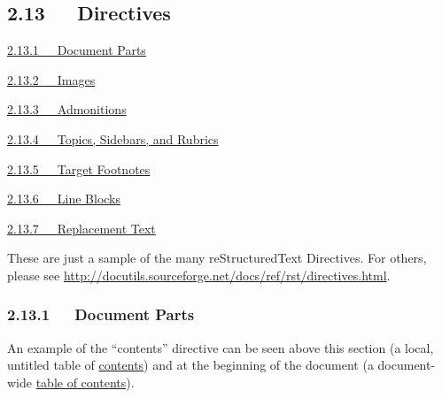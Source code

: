 \documentclass[10pt,a4paper,english]{article}
\begin{document}

\hypertarget{directives}{}
\subsection*{2.13~~~Directives}
\begin{list}{}{}
\item {} \href{\#document-parts}{2.13.1~~~Document Parts}

\item {} \href{\#images}{2.13.2~~~Images}

\item {} \href{\#admonitions}{2.13.3~~~Admonitions}

\item {} \href{\#topics-sidebars-and-rubrics}{2.13.4~~~Topics, Sidebars, and Rubrics}

\item {} \href{\#target-footnotes}{2.13.5~~~Target Footnotes}

\item {} \href{\#line-blocks}{2.13.6~~~Line Blocks}

\item {} \href{\#replacement-text}{2.13.7~~~Replacement Text}

\end{list}


These are just a sample of the many reStructuredText Directives.  For
others, please see
\href{http://docutils.sourceforge.net/docs/ref/rst/directives.html}{http://docutils.sourceforge.net/docs/ref/rst/directives.html}.



\hypertarget{document-parts}{}
\subsubsection*{2.13.1~~~Document Parts}

An example of the ``contents'' directive can be seen above this section
(a local, untitled table of \href{\#contents}{contents}) and at the beginning of the
document (a document-wide \href{\#table-of-contents}{table of contents}).


\end{document}
